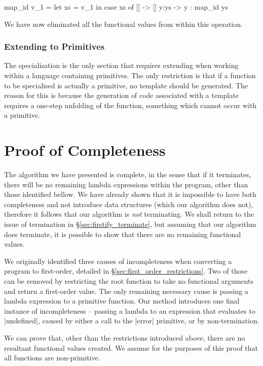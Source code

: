 \documentclass[preprint]{sigplanconf}
\begin{document}
\begin{code}
map_id v_1 =  let  xs = v_1
              in   case  xs of
                         []    -> []
                         y:ys  -> y : map_id ys
\end{code}

We have now eliminated all the functional values from within this operation.


\subsubsection{Extending to Primitives}

The specialisation is the only section that requires extending when working within a language containing primitives. The only restriction is that if a function to be specialised is actually a primitive, no template should be generated. The reason for this is because the generation of code associated with a template requires a one-step unfolding of the function, something which cannot occur with a primitive.

\section{Proof of Completeness}

The algorithm we have presented is complete, in the sense that if it terminates, there will be no remaining lambda expressions within the program, other than those identified bellow. We have already shown that it is impossible to have both completeness and not introduce data structures (which our algorithm does not), therefore it follows that our algorithm is \textit{not} terminating. We shall return to the issue of termination in \S\ref{sec:firstify_terminate}, but assuming that our algorithm does terminate, it is possible to show that there are no remaining functional values.

We originally identified three causes of incompleteness when converting a program to first-order, detailed in \S\ref{sec:first_order_restrictions}. Two of those can be removed by restricting the root function to take no functional arguments and return a first-order value. The only remaining necessary cause is passing a lambda expression to a primitive function. Our method introduces one final instance of incompleteness -- passing a lambda to an expression that evaluates to |undefined|, caused by either a call to the |error| primitive, or by non-termination.

We can prove that, other than the restrictions introduced above, there are no resultant functional values created. We assume for the purposes of this proof that all functions are non-primitive.
\end{document}
